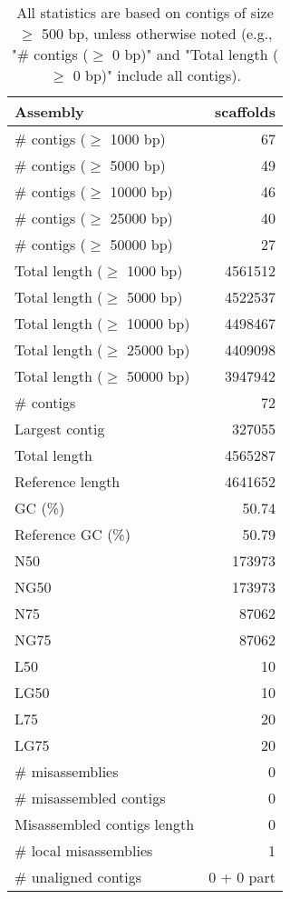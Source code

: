 \documentclass[12pt,a4paper]{article}
\begin{document}
\begin{table}[ht]
\begin{center}
\caption{All statistics are based on contigs of size $\geq$ 500 bp, unless otherwise noted (e.g., "\# contigs ($\geq$ 0 bp)" and "Total length ($\geq$ 0 bp)" include all contigs).}
\begin{tabular}{|l*{1}{|r}|}
\hline
Assembly & scaffolds \\ \hline
\# contigs ($\geq$ 1000 bp) & 67 \\ \hline
\# contigs ($\geq$ 5000 bp) & 49 \\ \hline
\# contigs ($\geq$ 10000 bp) & 46 \\ \hline
\# contigs ($\geq$ 25000 bp) & 40 \\ \hline
\# contigs ($\geq$ 50000 bp) & 27 \\ \hline
Total length ($\geq$ 1000 bp) & 4561512 \\ \hline
Total length ($\geq$ 5000 bp) & 4522537 \\ \hline
Total length ($\geq$ 10000 bp) & 4498467 \\ \hline
Total length ($\geq$ 25000 bp) & 4409098 \\ \hline
Total length ($\geq$ 50000 bp) & 3947942 \\ \hline
\# contigs & 72 \\ \hline
Largest contig & 327055 \\ \hline
Total length & 4565287 \\ \hline
Reference length & 4641652 \\ \hline
GC (\%) & 50.74 \\ \hline
Reference GC (\%) & 50.79 \\ \hline
N50 & 173973 \\ \hline
NG50 & 173973 \\ \hline
N75 & 87062 \\ \hline
NG75 & 87062 \\ \hline
L50 & 10 \\ \hline
LG50 & 10 \\ \hline
L75 & 20 \\ \hline
LG75 & 20 \\ \hline
\# misassemblies & 0 \\ \hline
\# misassembled contigs & 0 \\ \hline
Misassembled contigs length & 0 \\ \hline
\# local misassemblies & 1 \\ \hline
\# unaligned contigs & 0 + 0 part \\ \hline

\end{tabular}
\end{center}
\end{table}
\end{document}
